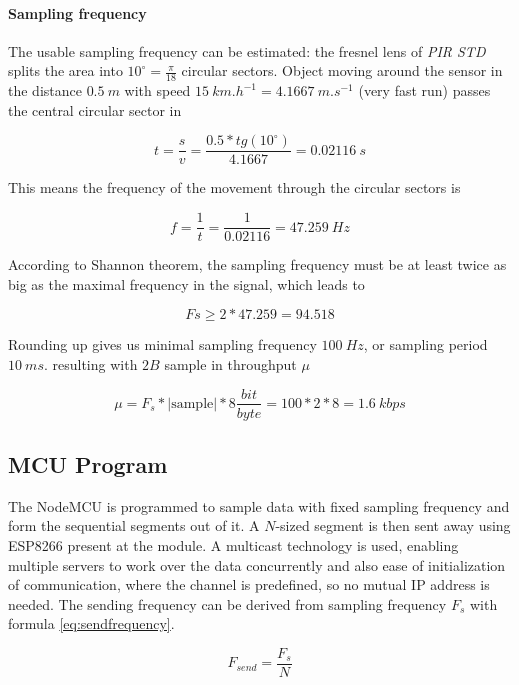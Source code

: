 \paragraph{Sampling frequency}
The usable sampling frequency can be estimated: the fresnel lens of {\it PIR STD} splits the
area into $10^{\circ} = \frac{\pi}{18}$ circular sectors. Object moving around the sensor in the distance $0.5~m$
with speed $15~km.h^{-1} = 4.1667~m.s^{-1}$ (very fast run) passes the central circular sector in

\begin{equation}
t = \frac{s}{v} = \frac{0.5*tg(10^{\circ})}{4.1667} = 0.02116~s
\end{equation}

This means the frequency of the movement through the circular sectors is

\begin{equation}
f = \frac{1}{t} = \frac{1}{0.02116} = 47.259~Hz
\end{equation}

According to Shannon theorem\cite{DigitalSignalProcessing}, the sampling frequency must be at least twice as big as the
maximal frequency in the signal, which leads to

\begin{equation}
Fs \geq 2*47.259 = 94.518 
\end{equation}

Rounding up gives us minimal sampling frequency $100~Hz$, or sampling period $10~ms$.
resulting with $2B$ sample in throughput $\mu$

\begin{equation}
\mu = F_s * |\text{sample}| * 8\frac{bit}{byte} = 100 * 2 * 8 = 1.6~kbps
\end{equation}


\subsection*{MCU Program}
The NodeMCU is programmed to sample data with fixed sampling frequency and form the sequential
segments out of it. A $N$-sized segment is then sent away using ESP8266 present at the module.
A multicast technology is used, enabling multiple servers to work over the data concurrently
and also ease of initialization of communication, where the channel is predefined, so
no mutual IP address is needed. The sending frequency can be derived from sampling frequency $F_s$
with formula \ref{eq:sendfrequency}.

\begin{equation}
F_{send} = \frac{F_s}{N}
\label{eq:sendfrequency}
\end{equation}

